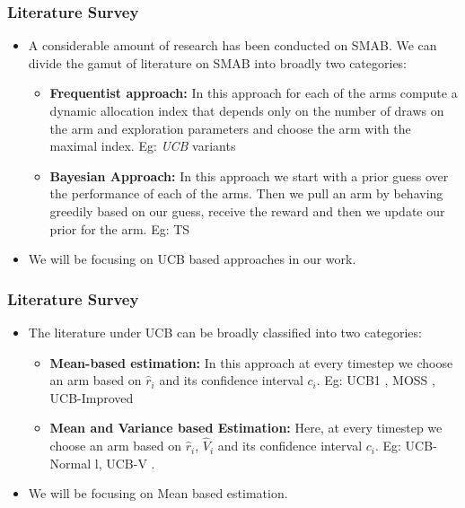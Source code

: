 \begin{frame}
\frametitle{Literature Survey}
\begin{itemize}
\item<1-> A considerable amount of research has been conducted on SMAB. We can divide the gamut of literature on SMAB into broadly two categories:
\begin{itemize}
\item<2-> \textbf{Frequentist approach:} In this approach for each of the arms compute a dynamic allocation index that depends only on the number of draws on the arm and exploration parameters and choose the arm with the maximal index. Eg:  \emph{UCB} variants
\item<3-> \textbf{Bayesian Approach:} In this approach we start with a prior guess over the performance of each of the arms. Then we pull an arm by behaving greedily based on our guess, receive the reward and then we update our prior for the arm. Eg: TS 
\end{itemize} 
\item<4-> We will be focusing on UCB based approaches in our work.
\end{itemize}
\end{frame}

\begin{frame}
\frametitle{Literature Survey}
\begin{itemize}
\item<1-> The literature under UCB can be broadly classified into two categories:
\begin{itemize}
\item<2-> \textbf{Mean-based estimation: } In this approach at every timestep we choose an arm based on $\hat{r}_i$ and its confidence interval $c_i$. Eg: UCB1 \cite{auer2002finite}, MOSS \cite{audibert2009minimax}, UCB-Improved \cite{auer2010ucb}
\item<3-> \textbf{Mean and Variance based Estimation: } Here, at every timestep we choose an arm based on $\hat{r}_i$, $\hat{V}_i$ and its confidence interval $c_i$. Eg: UCB-Normal \cite{auer2002finite}l, UCB-V \cite{audibert2009exploration}.
\end{itemize}
\item<4-> We will be focusing on Mean based estimation.
\end{itemize} 
\end{frame}


